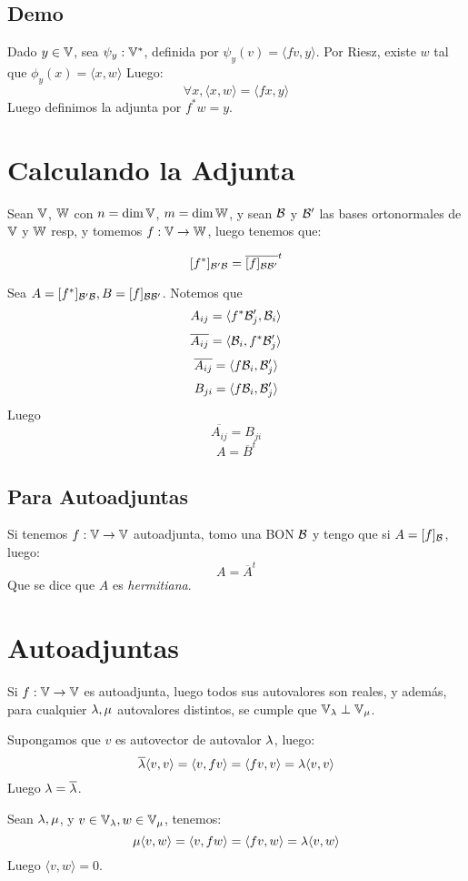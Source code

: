 \documentclass{article}
\begin{document}
\subsection*{Demo}
Dado $y \in \mathbb{V}$, sea $\psi_y : \mathbb{V}^*$, definida por $\psi_y(v) = \langle fv, y\rangle$. Por Riesz, existe $w$ tal que $\phi_y(x) = \langle x, w \rangle$
Luego:
\[\forall x, \langle x, w\rangle = \langle fx, y \rangle\]
Luego definimos la adjunta por $f^*w = y$.

\section*{Calculando la Adjunta}
Sean $\mathbb{V}$, $\mathbb{W}$ con $n = \dim \mathbb{V}$, $m = \dim \mathbb{W}$, y sean $\mathcal{B}$ y $\mathcal{B}'$ las bases ortonormales de $\mathbb{V}$ y $\mathbb{W}$ resp, y tomemos $f : \mathbb{V} \to \mathbb{W}$, luego tenemos que:

\[
    [f^*]_{\mathcal{B}'\mathcal{B}} = \overline{[f]_{\mathcal{B}\mathcal{B}'}}^t
\]

Sea $A = [f^*]_{\mathcal{B}'\mathcal{B}}, B = [f]_{\mathcal{B}\mathcal{B}'}$.
Notemos que
\[A_{ij} = \langle f^*\mathcal{B}'_j , \mathcal{B}_i \rangle\]
\[\overline {A_{ij}} = \langle \mathcal{B}_i, f^*\mathcal{B}'_j\rangle\]
\[\overline {A_{ij}} = \langle f\mathcal{B}_i, \mathcal{B}'_j\rangle\]
\[B_{ji} = \langle f\mathcal{B}_i, \mathcal{B}'_j\rangle\]
Luego
\[\overline{A_{ij}} = B_{ji}\]
\[A = \overline B ^ t\]

\subsection*{Para Autoadjuntas}
Si tenemos $f : \mathbb{V} \to \mathbb{V}$ autoadjunta, tomo una BON $\mathcal{B}$ y tengo que si $A = [f]_{\mathcal{B}}$, luego:
\[
    A = \overline A^t
\]
Que se dice que $A$ es \emph{hermitiana}.

\section*{Autoadjuntas}
Si $f : \mathbb{V} \to \mathbb{V}$ es autoadjunta, luego todos sus autovalores son reales, y además, para cualquier $\lambda, \mu$ autovalores distintos, se cumple que $\mathbb{V}_\lambda \perp \mathbb{V}_\mu$.

Supongamos que $v$ es autovector de autovalor $\lambda$, luego:
\[
    \overline {\lambda} \langle v, v \rangle = \langle v, fv\rangle = \langle fv, v\rangle = \lambda \langle v, v \rangle
\]
Luego $\lambda = \overline {\lambda}$.

Sean $\lambda, \mu$, y $v \in \mathbb{V}_\lambda, w \in \mathbb{V}_\mu$, tenemos:
\[
    \mu \langle v, w \rangle = \langle v, fw \rangle = \langle fv, w \rangle = \lambda \langle v, w \rangle
\]
Luego $\langle v, w \rangle = 0$.
\end{document}
